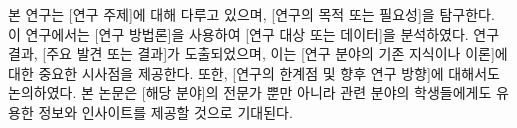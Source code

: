 본 연구는 [연구 주제]에 대해 다루고 있으며, [연구의 목적 또는 필요성]을 탐구한다. 
이 연구에서는 [연구 방법론]을 사용하여 [연구 대상 또는 데이터]을 분석하였다. 
연구 결과, [주요 발견 또는 결과]가 도출되었으며, 이는 [연구 분야의 기존 지식이나 이론]에 대한 중요한 시사점을 제공한다. 
또한, [연구의 한계점 및 향후 연구 방향]에 대해서도 논의하였다. 
본 논문은 [해당 분야]의 전문가 뿐만 아니라 관련 분야의 학생들에게도 유용한 정보와 인사이트를 제공할 것으로 기대된다.